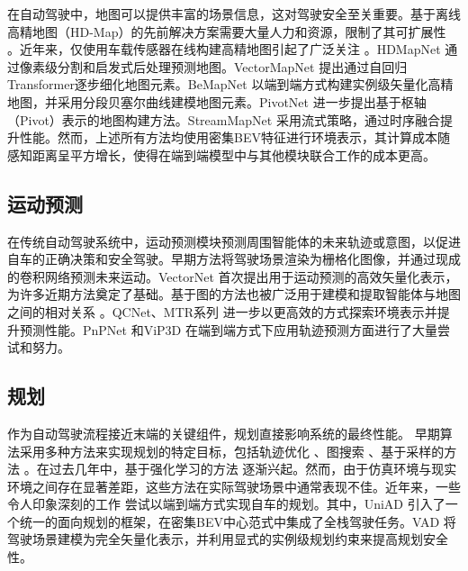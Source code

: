 在自动驾驶中，地图可以提供丰富的场景信息，这对驾驶安全至关重要。基于离线高精地图（HD-Map）的先前解决方案需要大量人力和资源，限制了其可扩展性 \cite{li2022hdmapnet}。近年来，仅使用车载传感器在线构建高精地图引起了广泛关注 \cite{li2022hdmapnet, liu2023vectormapnet, qiao2023end, ding2023pivotnet, yuan2024streammapnet}。HDMapNet \cite{li2022hdmapnet} 通过像素级分割和启发式后处理预测地图。VectorMapNet \cite{liu2023vectormapnet} 提出通过自回归Transformer逐步细化地图元素。BeMapNet \cite{qiao2023end} 以端到端方式构建实例级矢量化高精地图，并采用分段贝塞尔曲线建模地图元素。PivotNet \cite{ding2023pivotnet} 进一步提出基于枢轴（Pivot）表示的地图构建方法。StreamMapNet \cite{yuan2024streammapnet} 采用流式策略，通过时序融合提升性能。然而，上述所有方法均使用密集BEV特征进行环境表示，其计算成本随感知距离呈平方增长，使得在端到端模型中与其他模块联合工作的成本更高。

\subsection{运动预测}
\label{sec:related-forecasting}

在传统自动驾驶系统中，运动预测模块预测周围智能体的未来轨迹或意图，以促进自车的正确决策和安全驾驶。早期方法将驾驶场景渲染为栅格化图像，并通过现成的卷积网络预测未来运动\cite{chai2019multipath, phan2020covernet}。VectorNet \cite{gao2020vectornet} 首次提出用于运动预测的高效矢量化表示，为许多近期方法奠定了基础。基于图的方法也被广泛用于建模和提取智能体与地图之间的相对关系 \cite{zhao2021tnt, varadarajan2022multipath++, zhou2022hivt}。QCNet\cite{zhou2023query}、MTR系列 \cite{shi2022motion, shi2024mtr++} 进一步以更高效的方式探索环境表示并提升预测性能。PnPNet \cite{liang2020pnpnet} 和ViP3D \cite{gu2023vip3d} 在端到端方式下应用轨迹预测方面进行了大量尝试和努力。

\subsection{规划}
\label{sec:related-planning}
作为自动驾驶流程接近末端的关键组件，规划直接影响系统的最终性能。
早期算法采用多种方法来实现规划的特定目标，包括轨迹优化 \cite{diachuk2022motion, shi2022path}、图搜索 \cite{kim2014road, reda2024path}、基于采样的方法 \cite{ma2015efficient, li2020adaptive, orthey2023sampling}。在过去几年中，基于强化学习的方法 \cite{kendall2019learning, aradi2020survey, peng2022drl} 逐渐兴起。然而，由于仿真环境与现实环境之间存在显著差距，这些方法在实际驾驶场景中通常表现不佳。近年来，一些令人印象深刻的工作 \cite{hu2023planning, jiang2023vad} 尝试以端到端方式实现自车的规划。其中，UniAD\cite{hu2023planning} 引入了一个统一的面向规划的框架，在密集BEV中心范式中集成了全栈驾驶任务。VAD \cite{jiang2023vad} 将驾驶场景建模为完全矢量化表示，并利用显式的实例级规划约束来提高规划安全性。
